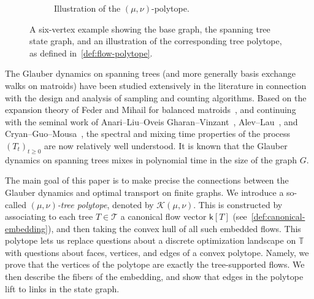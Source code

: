 \documentclass[11pt,a4paper]{article}
\newcommand{\wass}{{\mathcal{W}}}
\newcommand{\setoftrees}{{\mathcal{T}}}
\newcommand{\stategraph}{{\mathbb{T}}}
\newcommand{\embedding}{{\mathsf{k}}}
\newcommand{\flowpoly}{{\mathcal{K}}}
\begin{document}
\begin{figure}[t!]
\begin{subfigure}[t]{0.25\textwidth}
{%
            }
            \caption{Illustration of the $(\mu,\nu)$-polytope.}
        \end{subfigure}

        \caption{A six-vertex example showing the base graph, the spanning tree state graph, and an illustration of the corresponding tree polytope, as defined in~\cref{def:flow-polytope}.}
        \label{fig:flow-polytope}
    \end{figure}

    The Glauber dynamics on spanning trees (and more generally basis exchange walks on matroids) have been studied extensively in the literature in connection with the design and analysis of sampling and counting algorithms. Based on the expansion theory of Feder and Mihail for balanced matroids~\cite{feder1992balanced}, and continuing with the seminal work of Anari--Liu--Oveis Gharan--Vinzant~\cite{anari2024log}, Alev--Lau~\cite{alev2020improved}, and Cryan--Guo--Mousa~\cite{cryan2021modified}, the spectral and mixing time properties of the process $(T_t)_{t\ge 0}$ are now relatively well understood. It is known that the Glauber dynamics on spanning trees mixes in polynomial time in the size of the graph $G$.

    
    The main goal of this paper is to make precise the connections between the Glauber dynamics and optimal transport on finite graphs. We introduce a so-called \emph{$(\mu,\nu)$-tree polytope}, denoted by $\flowpoly(\mu,\nu)$. This is constructed by associating to each tree $T\in\setoftrees$ a canonical flow vector $\embedding[T]$ (see~\cref{def:canonical-embedding}), and then taking the convex hull of all such embedded flows. This polytope lets us replace questions about a discrete optimization landscape on $\stategraph$ with questions about faces, vertices, and edges of a convex polytope. Namely, we prove that the vertices of the polytope are exactly the tree-supported flows. We then describe the fibers of the embedding, and show that edges in the polytope lift to links in the state graph. 
\end{document}
